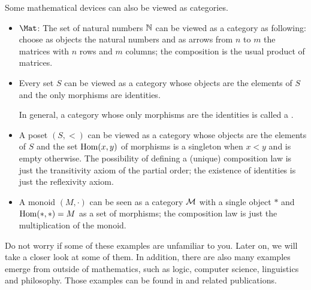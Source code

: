   \begin{exam}\label{exam:category2}
    Some mathematical devices can also be viewed as categories.
    \begin{itemize}
      \item $\Mat$: The set of natural numbers $\operatorname{\mathbb{N}}$ can be viewed as a category as following: choose as objects the natural numbers and as arrows from $n$ to $m$ the matrices with $n$ rows and $m$ columns; the composition is the usual product of matrices.
      \item Every set $S$ can be viewed as a category whose objects are the elements of $S$ and the only morphisms are identities.

                 In general, a category whose only morphisms are the identities is called a .
      \item A poset $(S,<)$ can be viewed as a category whose objects are the elements of $S$ and the set $\operatorname{Hom}(x,y)$ of morphisms is a singleton when $x < y$ and is empty otherwise.
                The possibility of defining a (unique) composition law is just the transitivity axiom of the partial order; the existence of identities is just the reflexivity axiom.
      \item A monoid $(M,\cdot)$ can be seen as a category ${\cal M}$ with a single object $\ast$ and $\operatorname{Hom}(\ast,\ast)=M$ as a set of morphisms; the composition law is just the multiplication of the monoid.
    \end{itemize}
  \end{exam}

  Do not worry if some of these examples are unfamiliar to you. Later on, we will take a closer look at some of them. In addition, there are also many examples emerge from outside of mathematics, such as logic, computer science, linguistics and philosophy. Those examples can be found in \cite{awodey2010category} and related publications.

